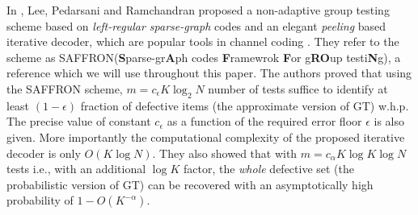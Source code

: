 \documentclass[conference,twocolumn]{IEEEtran}
\begin{document}
In \cite{lee2015saffron}, Lee, Pedarsani and Ramchandran proposed a non-adaptive group testing scheme based on \textit{left-regular sparse-graph} codes and an elegant \textit{peeling} based iterative decoder, which are popular tools in channel coding \cite{richardson2008modern}. They refer to the scheme as SAFFRON(\textbf{S}parse-gr\textbf{A}ph codes \textbf{F}ramewrok \textbf{F}or g\textbf{RO}up testi\textbf{N}g), a reference which we will use throughout this paper. The authors proved that using the SAFFRON scheme, $m=c_\epsilon K\log_2 N$ number of tests suffice to identify at least $(1-\epsilon)$ fraction of defective items (the approximate version of GT) w.h.p. The precise value of constant $c_\epsilon$ as a function of the required error floor $\epsilon$ is also given. More importantly the computational complexity of the proposed iterative decoder is only $O(K\log N)$. They also showed that with $m=c_\alpha K\log K \log N$ tests  i.e., with an additional $\log K$ factor, the \textit{whole} defective set (the probabilistic version of GT) can be recovered with an asymptotically high probability of $1-O(K^{-\alpha})$.
\end{document}
